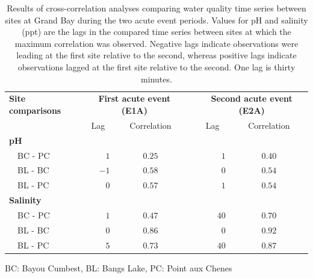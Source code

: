 \documentclass[letterpaper,12pt]{article}\usepackage[]{graphicx}\usepackage[]{color}
\begin{document}
\clearpage

\begin{table}[!tbp]
\caption{Results of cross-correlation analyses comparing water quality time series between sites at Grand Bay during the two acute event periods.  Values for pH and salinity (ppt) are the lags in the compared time series between sites at which the maximum correlation was observed.  Negative lags indicate observations were leading at the first site relative to the second, whereas positive lags indicate observations lagged at the first site relative to the second.  One lag is thirty minutes.\label{tab:ccfwq}} 
\begin{center}
\begin{tabular}{lrccrc}
\hline\hline
\multicolumn{1}{l}{\bfseries Site comparisons}&\multicolumn{2}{c}{\bfseries First acute event (E1A)}&\multicolumn{1}{c}{\bfseries }&\multicolumn{2}{c}{\bfseries Second acute event (E2A)}\tabularnewline
\cline{2-3} \cline{5-6}
\multicolumn{1}{l}{}&\multicolumn{1}{c}{Lag}&\multicolumn{1}{c}{Correlation}&\multicolumn{1}{c}{}&\multicolumn{1}{c}{Lag}&\multicolumn{1}{c}{Correlation}\tabularnewline
\hline
{\bfseries pH}&&&&&\tabularnewline
~~BC - PC&$ 1$&$0.25$&&$ 1$&$0.40$\tabularnewline
~~BL - BC&$-1$&$0.58$&&$ 0$&$0.54$\tabularnewline
~~BL - PC&$ 0$&$0.57$&&$ 1$&$0.54$\tabularnewline
\hline
{\bfseries Salinity}&&&&&\tabularnewline
~~BC - PC&$ 1$&$0.47$&&$40$&$0.70$\tabularnewline
~~BL - BC&$ 0$&$0.86$&&$ 0$&$0.92$\tabularnewline
~~BL - PC&$ 5$&$0.73$&&$40$&$0.87$\tabularnewline
\hline
\end{tabular}\end{center}

\footnotesize BC: Bayou Cumbest, BL: Bangs Lake, PC: Point aux Chenes\end{table}

\clearpage
\end{document}
